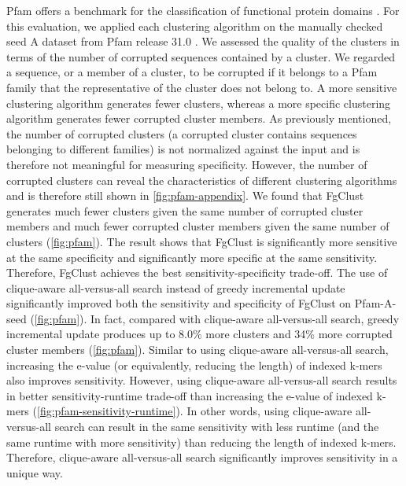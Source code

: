 \documentclass{bioinfo}
\begin{document}
Pfam offers a benchmark for the classification of functional protein domains \citep{finn2016pfam}.
For this evaluation, we applied each clustering algorithm on
the manually checked seed A dataset from Pfam release 31.0 \citep{finn2016pfam}.
We assessed the quality of the clusters in terms of 
the number of corrupted sequences contained by a cluster.
We regarded a sequence, or a member of a cluster, to be corrupted if it belongs to a Pfam family that the representative of the cluster does not belong to.
A more sensitive clustering algorithm generates fewer clusters, whereas a more specific clustering algorithm generates fewer corrupted cluster members.
As previously mentioned, 
the number of corrupted clusters (a corrupted cluster contains sequences belonging to different families) is not normalized against the input and is therefore not meaningful for measuring specificity.
However, the number of corrupted clusters can reveal the characteristics of different clustering algorithms and is therefore still shown in \cref{fig:pfam-appendix}.
We found that FgClust generates much fewer clusters given the same number of corrupted cluster members and much fewer corrupted cluster members given the same number of clusters (\cref{fig:pfam}).
The result shows that FgClust is significantly more sensitive at the same specificity and significantly more specific at the same sensitivity.
Therefore, FgClust achieves the best sensitivity-specificity trade-off.
The use of clique-aware all-versus-all search instead of greedy incremental update significantly improved both the sensitivity and specificity of FgClust on Pfam-A-seed (\cref{fig:pfam}).
In fact, compared with clique-aware all-versus-all search, greedy incremental update produces up to 8.0\% more clusters and 34\% more corrupted cluster members (\cref{fig:pfam}).
Similar to using clique-aware all-versus-all search, increasing the e-value (or equivalently, reducing the length) of indexed k-mers also improves sensitivity.
However, using clique-aware all-versus-all search results in better sensitivity-runtime trade-off than increasing the e-value of indexed k-mers (\cref{fig:pfam-sensitivity-runtime}).
In other words, using clique-aware all-versus-all search can result in the same sensitivity with less runtime (and the same runtime with more sensitivity) than reducing the length of indexed k-mers.
Therefore, clique-aware all-versus-all search significantly improves sensitivity in a unique way.
\end{document}
